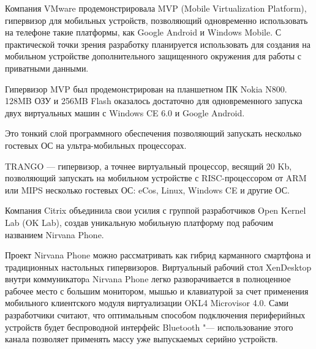 \documentclass[10pt, a5paper]{article}
\begin{document}
Компания VMware продемонстрировала MVP (Mobile \linebreak Virtualization Platform), гипервизор для мобильных устройств, позволяющий одновременно использовать на телефоне такие платформы, как Google Android и Windows Mobile. С практической точки зрения разработку планируется использовать для создания на мобильном устройстве дополнительного защищенного окружения для работы с приватными данными. 

Гипервизор MVP был продемонстрирован на планшетном ПК Nokia N800. 128MB ОЗУ и 256MB Flash оказалось достаточно для одновременного запуска двух виртуальных машин с Windows CE 6.0 и Google Android.

Это тонкий слой программного обеспечения позволяющий запускать несколько гостевых ОС на ультра-мобильных процессорах.

TRANGO --- гипервизор, а точнее виртуальный процессор, весящий 20 Kb, позволяющий запускать на мобильном устройстве с RISC-процессором от ARM или MIPS несколько гостевых ОС: eCos, Linux, Windows CE и другие ОС.

Компания Citrix объединила свои усилия с группой разработчиков Open Kernel Lab (OK Lab), создав уникальную мобильную платформу под рабочим названием Nirvana Phone.

Проект Nirvana Phone можно рассматривать как гибрид карманного смартфона и традиционных настольных гипервизоров. Виртуальный рабочий стол XenDesktop внутри коммуникаторa Nirvana Phone легко разворачивается в полноценное рабочее место с большим монитором, мышью и клавиатурой за счет применения мобильного клиентского модуля виртуализации OKL4 Microvisor 4.0. Сами разработчики считают, что оптимальным способом подключения периферийных устройств будет беспроводной интерфейс \linebreak Bluetooth "--- использование этого канала позволяет применять массу уже выпускаемых серийно устройств.
\end{document}
